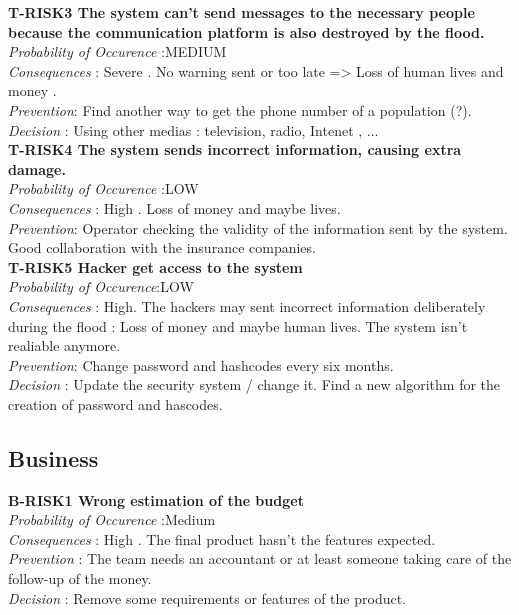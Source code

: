 	

	\textbf{ T-RISK3 The system can't send messages to the necessary people because the communication platform is also destroyed by the flood.} \\
	\textit{Probability of Occurence} :MEDIUM\\
	\textit{Consequences} : Severe . No warning sent or too late => Loss of human lives and money .\\
	\textit{Prevention}: Find another way to get the phone number of a population (?). \\
	\textit{Decision} : Using other medias : television, radio, Intenet , ... \\
	

	\textbf{ T-RISK4 The system sends incorrect information, causing extra damage.} \\
	\textit{Probability of Occurence} :LOW\\
	\textit{Consequences} : High . Loss of money and maybe lives.\\
	\textit{Prevention}: Operator checking the validity of the information sent by the system.\\
	Good collaboration with the insurance companies. \\

	\textbf{ T-RISK5 Hacker get access to the system} \\
	\textit{Probability of Occurence}:LOW \\
	\textit{Consequences} : High. The hackers may sent incorrect information deliberately during the flood : Loss of money and maybe human lives. The system isn't realiable anymore. \\
	\textit{Prevention}: Change password and hashcodes every six months. \\
	\textit{Decision} : Update the security system / change it. Find a new algorithm for the creation of password and hascodes. \\


\subsection{Business}

	\textbf{ B-RISK1 Wrong estimation of the budget} \\
	\textit{Probability of Occurence} :Medium \\
	\textit{Consequences} : High . The final product hasn't the features expected. \\
	\textit{Prevention} : The team needs an accountant or at least someone taking care of the follow-up of the money. \\
	\textit{Decision} : Remove some requirements or features of the product. \\
	
